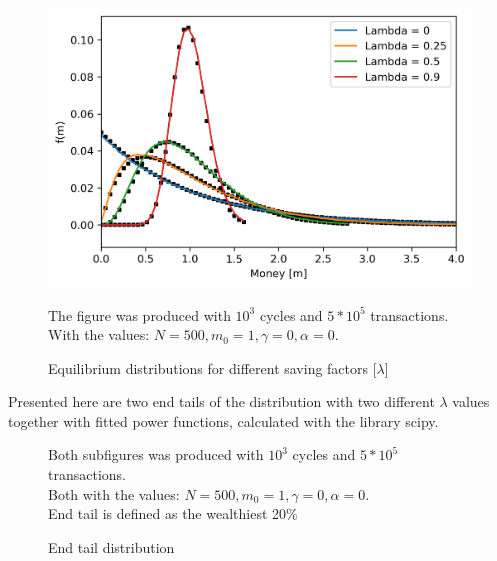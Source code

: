 \documentclass[a4paper,11pt]{article}
\begin{document}
\begin{figure}[H]
	\includegraphics[scale=1]{figures/saving_1000c_100000t.png} 
	\caption{Equilibrium distributions for different saving factors [$\lambda$]}
{\small The figure was produced with $10^3$ cycles and $5*10^5$ transactions. \\With the values: $N = 500, m_0 = 1, \gamma = 0, \alpha = 0$. }
\end{figure}


Presented here are two end tails of the distribution with two different $\lambda$ values together with fitted power functions, calculated with the library scipy.

\begin{figure}[H]
  \hfill
  \caption{End tail distribution}
{\small Both subfigures was produced with $10^3$ cycles and $5*10^5$ transactions. \\Both with the values: $N = 500, m_0 = 1, \gamma = 0, \alpha = 0$. \\End tail is defined as the wealthiest 20\% }
\end{figure}
\end{document}
